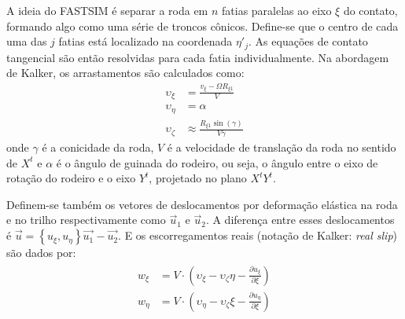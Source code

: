 A ideia do FASTSIM é separar a roda em $n$ fatias paralelas ao eixo $\xi$ do contato, formando algo como uma série de
troncos cônicos. Define-se que o centro de cada uma das $j$ fatias está localizado na coordenada $\eta'_j$.
As equações de contato tangencial são então resolvidas para cada fatia individualmente. Na abordagem de Kalker, 
os arrastamentos são calculados como:
\begin{align}
    \upsilon_\xi &= \frac{v_\xi - \Omega R_{\xi 1}}{V} \\
    \upsilon_\eta &= \alpha \\
    \upsilon_\zeta &\approx \frac{R_{\xi1}\sin(\gamma)}{V\gamma} 
\end{align}
onde $\gamma$ é a conicidade da roda, $V$ é a velocidade de translação da roda no sentido de $X^t$ e
$\alpha$ é o ângulo de guinada do rodeiro, ou seja, o ângulo entre o eixo de rotação do rodeiro e o eixo $Y^t$, 
projetado no plano $X^t Y^t$.

Definem-se também os vetores de deslocamentos por deformação elástica na roda e no trilho respectivamente
como $\vec{u}_1$ e $\vec{u}_2$. A diferença entre esses deslocamentos é $\vec{u} = \left\{u_\xi,u_\eta\right\} \vec{u_1} - \vec{u_2}$. E
os escorregamentos reais (notação de Kalker: \textit{real slip}) são dados por:
\begin{align}
\begin{split}
    w_\xi &= V\cdot \left(\upsilon_\xi - \upsilon_\zeta \eta - \frac{\partial u_\xi}{\partial\xi}\right) \\
    w_\eta &= V\cdot \left(\upsilon_\eta - \upsilon_\zeta \xi - \frac{\partial u_\eta}{\partial\xi}\right)
\end{split} \label{eq: real_slip}
\end{align}

